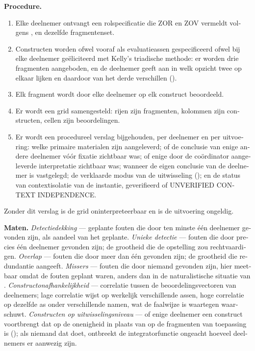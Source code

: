 \begin{dutch}
\textbf{Procedure.}

\begin{enumerate}
  \item Elke deelnemer ontvangt een rolspecificatie die ZOR en ZOV vermeldt volgens , en dezelfde fragmentenset.
  \item Constructen worden ofwel vooraf als evaluatieassen gespecificeerd ofwel bij elke deelnemer geëliciteerd met Kelly's triadische methode: er worden drie fragmenten aangeboden, en de deelnemer geeft aan in welk opzicht twee op elkaar lijken en daardoor van het derde verschillen ().
  \item Elk fragment wordt door elke deelnemer op elk construct beoordeeld.
  \item Er wordt een grid samengesteld: rijen zijn fragmenten, kolommen zijn constructen, cellen zijn beoordelingen.
  \item Er wordt een procedureel verslag bijgehouden, per deelnemer en per uitvoering: welke primaire materialen zijn aangeleverd; of de conclusie van enige andere deelnemer vóór fixatie zichtbaar was; of enige door de coördinator aangeleverde interpretatie zichtbaar was; wanneer de eigen conclusie van de deelnemer is vastgelegd; de verklaarde modus van de uitwisseling (); en de status van contextisolatie van de instantie, geverifieerd of UNVERIFIED CONTEXT INDEPENDENCE.
\end{enumerate}
Zonder dit verslag is de grid oninterpreteerbaar en is de uitvoering ongeldig.

\textbf{Maten.} \emph{Detectiedekking} — geplante fouten die door ten minste één deelnemer gevonden zijn, als aandeel van het geplante. \emph{Unieke detectie} — fouten die door precies één deelnemer gevonden zijn; de grootheid die de opstelling zou rechtvaardigen. \emph{Overlap} — fouten die door meer dan één gevonden zijn; de grootheid die redundantie aangeeft. \emph{Missers} — fouten die door niemand gevonden zijn, hier meetbaar omdat de fouten geplant waren, anders dan in de naturalistische situatie van . \emph{Constructonafhankelijkheid} — correlatie tussen de beoordelingsvectoren van deelnemers; lage correlatie wijst op werkelijk verschillende assen, hoge correlatie op dezelfde as onder verschillende namen, wat de faalwijze is waartegen  waarschuwt. \emph{Constructen op uitwisselingsniveau} — of enige deelnemer een construct voortbrengt dat op de onenigheid in plaats van op de fragmenten van toepassing is (); als niemand dat doet, ontbreekt de integratorfunctie ongeacht hoeveel deelnemers er aanwezig zijn.


\end{dutch}

